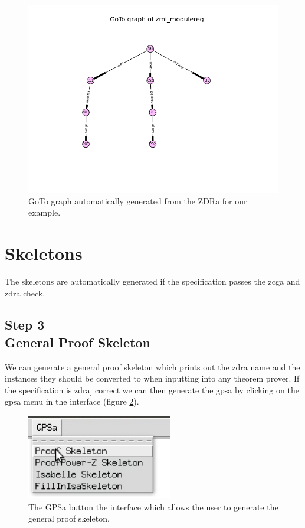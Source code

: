 \begin{figure}[H]
\centering
\includegraphics[scale=0.55]{Figures/fullexample/goto_fullexample.jpg}
\caption{GoTo graph automatically generated from the ZDRa for our example. \label{fig:gotoexample}}
\end{figure}

\section{Skeletons}

The skeletons are automatically generated if the specification passes the
\gls{zcga} and \gls{zdra} check.

\subsection{Step 3\\General Proof Skeleton}

We can generate a general proof skeleton which prints out the \gls{zdra} name
and the instances they should be converted to when inputting into any theorem
prover. If the specification is \gls{zdra}] correct we can then generate the
\gls{gpsa} by clicking on the \gls{gpsa} menu in the interface (figure
\ref{fig:gpsabutton}).

\begin{figure}[H]
\centering
\includegraphics[scale=0.45]{Figures/fullexample/gpsa.png}
\caption{The GPSa button the interface which allows the user to generate the general proof skeleton. \label{fig:gpsabutton}}
\end{figure}

